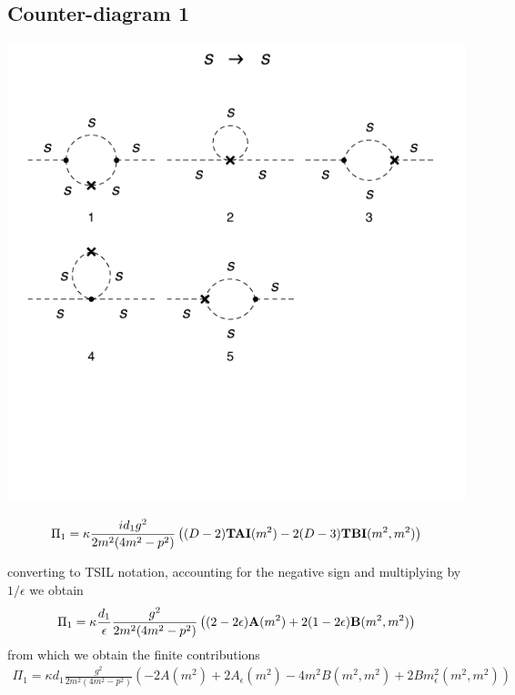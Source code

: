 \documentclass[11pt]{article}
\begin{document}
 
 
 
 \subsection*{Counter-diagram 1}
\begin{center}
\includegraphics{2loop_1c.pdf}
\end{center}
 
 \begin{align}
 \Pi_1 = \kappa \frac{i  d_1 g^2}{ 2 m^2 (4m^2-p^2)} \left( (D-2){\tt{\mathbf{TAI}}}(m^2)-2(D-3){\tt{\mathbf{TBI}}}(m^2,m^2) \right)  
 \end{align}
 
 converting to TSIL notation, accounting for the negative sign and multiplying by $1/\epsilon$ we obtain
  \begin{align}
 \Pi_1 = \kappa \frac{ d_1 }{\epsilon}\frac{g^2}{ 2 m^2 (4m^2-p^2)} \left( (2-2\epsilon){\tt{\mathbf{A}}}(m^2)+2(1-2\epsilon){\tt{\mathbf{B}}}(m^2,m^2) \right)  
 \end{align}
 from which we obtain the finite contributions
\begin{align}
 \Pi_1 = \kappa d_1 \frac{g^2}{ 2 m^2 (4m^2-p^2)} \left( -2 A(m^2)+2A_{\epsilon}(m^2)-4m^2B(m^2,m^2)+2Bm^2_{\epsilon}(m^2,m^2)\right)
 \end{align}
 
\end{document}
